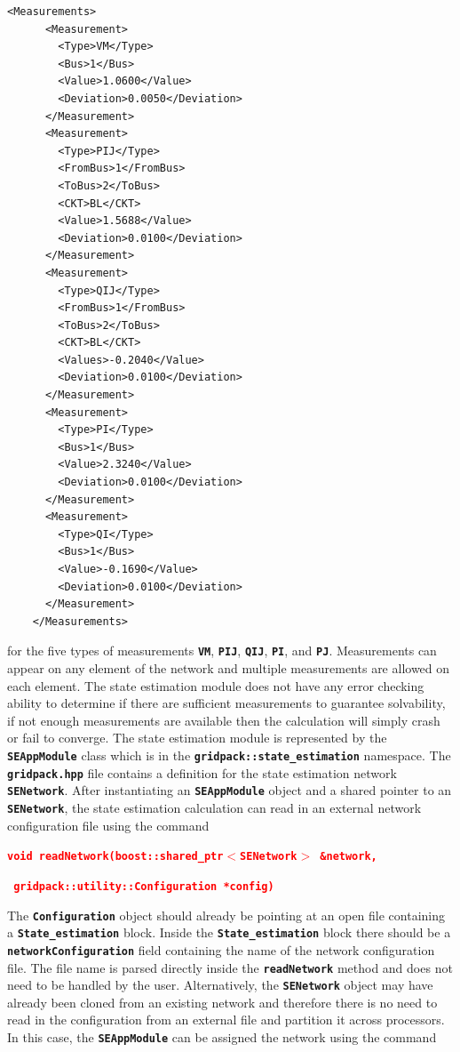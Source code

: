 \documentclass[12pt]{report} %
\begin{document}
{
\color{red}
\begin{Verbatim}[fontseries=b]
    <Measurements>
      <Measurement>
        <Type>VM</Type>
        <Bus>1</Bus>
        <Value>1.0600</Value>
        <Deviation>0.0050</Deviation>
      </Measurement>
      <Measurement>
        <Type>PIJ</Type>
        <FromBus>1</FromBus>
        <ToBus>2</ToBus>
        <CKT>BL</CKT>
        <Value>1.5688</Value>
        <Deviation>0.0100</Deviation>
      </Measurement>
      <Measurement>
        <Type>QIJ</Type>
        <FromBus>1</FromBus>
        <ToBus>2</ToBus>
        <CKT>BL</CKT>
        <Values>-0.2040</Value>
        <Deviation>0.0100</Deviation>
      </Measurement>
      <Measurement>
        <Type>PI</Type>
        <Bus>1</Bus>
        <Value>2.3240</Value>
        <Deviation>0.0100</Deviation>
      </Measurement>
      <Measurement>
        <Type>QI</Type>
        <Bus>1</Bus>
        <Value>-0.1690</Value>
        <Deviation>0.0100</Deviation>
      </Measurement>
    </Measurements>
\end{Verbatim}
}

for the five types of measurements \texttt{\textbf{VM}}, \texttt{\textbf{PIJ}}, \texttt{\textbf{QIJ}}, \texttt{\textbf{PI}}, and \texttt{\textbf{PJ}}. Measurements can appear on any element of the network and multiple measurements are allowed on each element. The state estimation module does not have any error checking ability to determine if there are sufficient measurements to guarantee solvability, if not enough measurements are available then the calculation will simply crash or fail to converge.
The state estimation module is represented by the \texttt{\textbf{SEAppModule}} class which is in the \texttt{\textbf{gridpack::state\_estimation}} namespace. The \texttt{\textbf{gridpack.hpp}} file contains a definition for the state estimation network \texttt{\textbf{SENetwork}}. After instantiating an \texttt{\textbf{SEAppModule}} object and a shared pointer to an \texttt{\textbf{SENetwork}}, the state estimation calculation can read in an external network configuration file using the command

\textcolor{red}{\texttt{\textbf{void readNetwork(boost::shared\_ptr$\boldsymbol{\mathrm{<}}$SENetwork$\boldsymbol{\mathrm{>}}$ \&network,}}}

\textcolor{red}{\texttt{\textbf{    gridpack::utility::Configuration *config)}}}

The \texttt{\textbf{Configuration}} object should already be pointing at an open file containing a \texttt{\textbf{State\_estimation}} block. Inside the \texttt{\textbf{State\_estimation}} block there should be a \texttt{\textbf{networkConfiguration}} field containing the name of the network configuration file. The file name is parsed directly inside the \texttt{\textbf{readNetwork}} method and does not need to be handled by the user.
Alternatively, the \texttt{\textbf{SENetwork}} object may have already been cloned from an existing network and therefore there is no need to read in the configuration from an external file and partition it across processors. In this case, the \texttt{\textbf{SEAppModule}} can be assigned the network using the command
\end{document}
